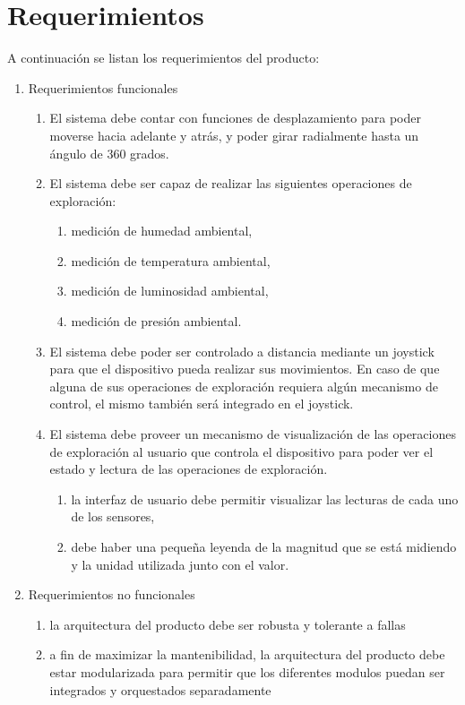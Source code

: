 


\section{Requerimientos}
A continuación se listan los requerimientos del producto:
\begin{enumerate}	
	
	\item Requerimientos funcionales		
	\begin{enumerate}			
		\item El sistema debe contar con funciones de desplazamiento para poder moverse hacia adelante y atrás, y poder girar radialmente hasta un ángulo de 360 grados.			
		\item El sistema debe ser capaz de realizar las siguientes operaciones de exploración:			
			\begin{enumerate}				
				\item medición de humedad ambiental,				
				\item medición de temperatura ambiental,				
				\item medición de luminosidad ambiental,				
				\item medición de presión ambiental.			
			\end{enumerate}			
		\item El sistema debe poder ser controlado a distancia mediante un joystick para que el dispositivo pueda realizar sus movimientos. En caso de que alguna de sus operaciones de exploración requiera algún mecanismo de control, el mismo también será integrado en el joystick.		
		\item El sistema debe proveer un mecanismo de visualización de las operaciones de exploración al usuario que controla el dispositivo para poder ver el estado y lectura de las operaciones de exploración.		
		\begin{enumerate}	
			\item la interfaz de usuario debe permitir visualizar las lecturas de cada uno de los sensores,
			\item debe haber una pequeña leyenda de la magnitud que se está midiendo y la unidad utilizada junto con el valor.
		\end{enumerate}		
		
	\end{enumerate}	
	
	\item Requerimientos no funcionales		
		\begin{enumerate}			
			\item la arquitectura del producto debe ser robusta y tolerante a fallas
			\item a fin de maximizar la mantenibilidad, la arquitectura del producto debe estar modularizada para permitir que los diferentes modulos puedan ser integrados y orquestados separadamente
			
		\end{enumerate}	
	
\end{enumerate}
